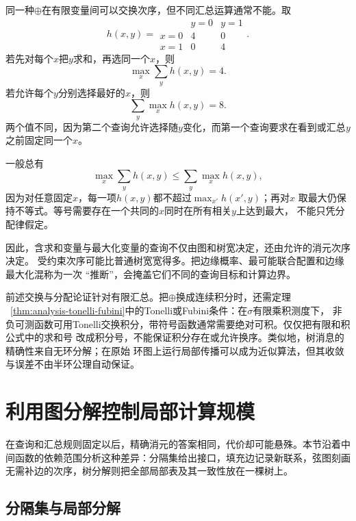 同一种\(\oplus\)在有限变量间可以交换次序，但不同汇总运算通常不能。取
\[
  h(x,y)=
  \begin{array}{c|cc}
    &y=0&y=1\\ \hline
    x=0&4&0\\
    x=1&0&4
  \end{array}.
\]
若先对每个\(x\)把\(y\)求和，再选同一个\(x\)，则
\begin{equation}
  \max_x\sum_y h(x,y)=4.
  \label{eq:graph-theory-max-sum-order-a}
\end{equation}
若允许每个\(y\)分别选择最好的\(x\)，则
\begin{equation}
  \sum_y\max_x h(x,y)=8.
  \label{eq:graph-theory-max-sum-order-b}
\end{equation}
两个值不同，因为第二个查询允许选择随\(y\)变化，而第一个查询要求在看到或汇总\(y\)
之前固定同一个\(x\)。

一般总有
\[
  \max_x\sum_y h(x,y)\leq\sum_y\max_x h(x,y),
\]
因为对任意固定\(x\)，每一项\(h(x,y)\)都不超过\(\max_{x'}h(x',y)\)；再对\(x\)
取最大仍保持不等式。等号需要存在一个共同的\(x\)同时在所有相关\(y\)上达到最大，
不能只凭分配律假定。

因此，含求和变量与最大化变量的查询不仅由图和树宽决定，还由允许的消元次序决定。
受约束次序可能比普通树宽宽得多。把边缘概率、最可能联合配置和边缘最大化混称为一次
“推断”，会掩盖它们不同的查询目标和计算边界。

前述交换与分配论证针对有限汇总。把\(\oplus\)换成连续积分时，还需定理
~\ref{thm:analysis-tonelli-fubini}中的Tonelli或Fubini条件：在$\sigma$有限乘积测度下，
非负可测函数可用Tonelli交换积分，带符号函数通常需要绝对可积。仅仅把有限和积公式中的求和号
改成积分号，不能保证积分存在或允许换序。类似地，树消息的精确性来自无环分解；在原始
环图上运行局部传播可以成为近似算法，但其收敛与误差不由半环公理自动保证。

\section{利用图分解控制局部计算规模}
\label{sec:graph-theory-traversal-separation-decomposition}

在查询和汇总规则固定以后，精确消元的答案相同，代价却可能悬殊。本节沿着中间函数的依赖范围分析这种差异：分隔集给出接口，填充边记录新联系，弦图刻画无需补边的次序，树分解则把全部局部表及其一致性放在一棵树上。

\subsection{分隔集与局部分解}

